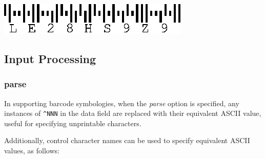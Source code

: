 \includegraphics{images/optincludecheckintext.eps}

\hypertarget{input-processing}{%
\subsection{Input Processing}\label{input-processing}}

\hypertarget{parse}{%
\subsubsection{parse}\label{parse}}

In supporting barcode symbologies, when the \emph{parse} option is
specified, any instances of \texttt{\^{}NNN} in the data field are
replaced with their equivalent ASCII value, useful for specifying
unprintable characters.

Additionally, control character names can be used to specify equivalent
ASCII values, as follows:

